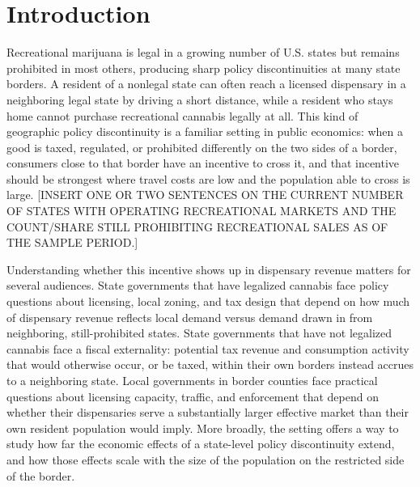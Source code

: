 \documentclass[12pt]{article}
\begin{document}
\section{Introduction}

Recreational marijuana is legal in a growing number of U.S. states but remains prohibited in most others,
producing sharp policy discontinuities at many state borders. A resident of a nonlegal state can often
reach a licensed dispensary in a neighboring legal state by driving a short distance, while a resident who
stays home cannot purchase recreational cannabis legally at all. This kind of geographic policy
discontinuity is a familiar setting in public economics: when a good is taxed, regulated, or prohibited
differently on the two sides of a border, consumers close to that border have an incentive to cross it, and
that incentive should be strongest where travel costs are low and the population able to cross is large.
[INSERT ONE OR TWO SENTENCES ON THE CURRENT NUMBER OF STATES WITH OPERATING RECREATIONAL MARKETS AND THE
COUNT/SHARE STILL PROHIBITING RECREATIONAL SALES AS OF THE SAMPLE PERIOD.]

Understanding whether this incentive shows up in dispensary revenue matters for several audiences.
State governments that have legalized cannabis face policy questions about licensing, local zoning, and tax
design that depend on how much of dispensary revenue reflects local demand versus demand drawn in from
neighboring, still-prohibited states. State governments that have not legalized cannabis face a fiscal
externality: potential tax revenue and consumption activity that would otherwise occur, or be taxed, within
their own borders instead accrues to a neighboring state. Local governments in border counties face
practical questions about licensing capacity, traffic, and enforcement that depend on whether their
dispensaries serve a substantially larger effective market than their own resident population would imply.
More broadly, the setting offers a way to study how far the economic effects of a state-level policy
discontinuity extend, and how those effects scale with the size of the population on the restricted side of
the border.
\end{document}
